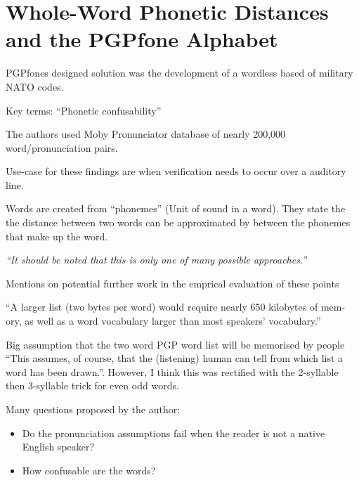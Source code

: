 \section{Whole-Word Phonetic Distances and the PGPfone Alphabet}

PGPfones designed solution was the development of a wordless based of military NATO codes.

Key terms: ``Phonetic confusability''

The authors used Moby Pronunciator database of nearly 200,000 word/pronunciation pairs.

Use-case for these findings are when verification needs to occur over a auditory line.

Words are created from ``phonemes'' (Unit of sound in a word). They state the the distance between two words can be approximated by between the phonemes that make up the word.

\textit{``It should be noted that this is only one of many possible approaches.''}

Mentions on potential further work in the emprical evaluation of these points

``A larger list (two
bytes per word) would require nearly 650 kilobytes of mem-
ory, as well as a word vocabulary larger than most speakers'
vocabulary.''

Big assumption that the two word PGP word list will be memorised by people ``This assumes, of course, that the (listening) human can tell from which list a word has been drawn.''. However, I think this was rectified with the 2-syllable then 3-syllable trick for even odd words.

Many questions proposed by the author:
\begin{itemize}
    \item Do the pronunciation assumptions fail when the reader is not a native English speaker?
    \item How confusable are the words?
\end{itemize}
